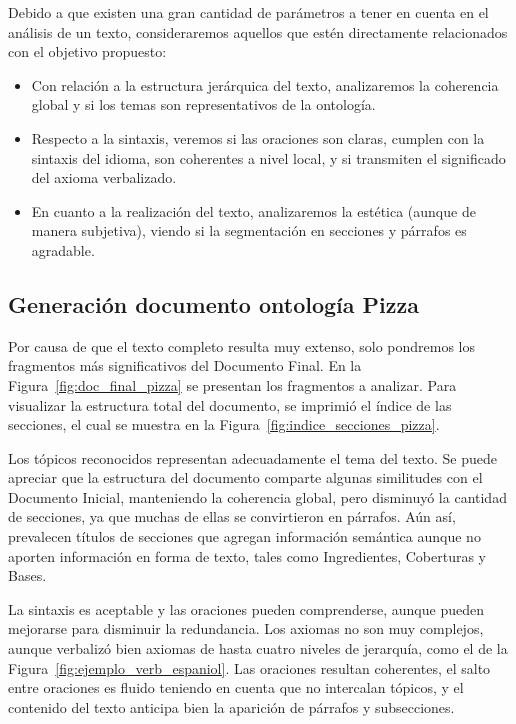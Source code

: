 Debido a que existen una gran cantidad de  parámetros a tener en cuenta en el análisis de un texto, consideraremos aquellos que estén directamente relacionados con el objetivo propuesto: 

\begin{itemize}
    \item Con relación a la estructura jerárquica del texto, analizaremos la coherencia global y si los temas son representativos de la ontología.
    \item Respecto a la sintaxis, veremos si las oraciones son claras, cumplen con la sintaxis del idioma, son coherentes a nivel local, y si transmiten el significado del axioma verbalizado. 
    \item En cuanto a la realización del texto, analizaremos la estética (aunque de manera subjetiva), viendo si la segmentación en secciones y párrafos es agradable.
\end{itemize}


\subsection{Generación documento ontología Pizza}
Por causa de que el texto completo resulta muy extenso, solo pondremos los fragmentos más significativos del Documento Final. En la Figura~\ref{fig:doc_final_pizza} se presentan los fragmentos a analizar. Para visualizar la estructura total del documento, se imprimió el índice de las secciones, el cual se muestra en la Figura~\ref{fig:indice_secciones_pizza}. 

Los tópicos reconocidos representan adecuadamente el tema del texto. Se puede apreciar que la estructura del documento comparte algunas similitudes con el Documento Inicial, manteniendo la coherencia global, pero disminuyó la cantidad de secciones, ya que muchas de ellas se convirtieron en párrafos. Aún así, prevalecen títulos de secciones que agregan información semántica aunque no aporten información en forma de texto, tales como Ingredientes, Coberturas y Bases.

La sintaxis es aceptable y las oraciones pueden comprenderse, aunque pueden mejorarse para disminuir la redundancia. Los axiomas no son muy complejos, aunque verbalizó bien axiomas de hasta cuatro niveles de jerarquía, como el de la Figura~\ref{fig:ejemplo_verb_espaniol}. Las oraciones resultan coherentes, el salto entre oraciones es fluido teniendo en cuenta que no intercalan tópicos, y el contenido del texto anticipa bien la aparición de párrafos y subsecciones.

